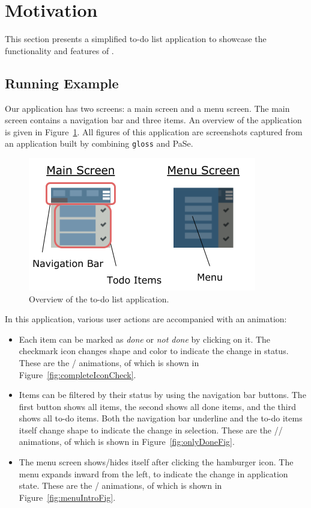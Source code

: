 \section{Motivation}
\label{sec:motivation}

This section presents a simplified to-do list application to showcase the
functionality and features of \dsl{}.

\subsection{Running Example}

Our application has two screens: a main screen and a menu screen. The main screen contains a navigation bar and three items. An overview of the application is given in Figure~\ref{fig:appOverview}. All figures of this application are screenshots captured from an application built by combining \texttt{gloss} and PaSe.

\begin{figure}[!htbp]
\centering
\includegraphics[width=\figscale\textwidth]{pictures/app_overview}
\caption{Overview of the to-do list application.}
\label{fig:appOverview}
\end{figure}

In this application, various user actions are accompanied with an animation:
\begin{itemize}
\item Each item can be marked as \emph{done} or \emph{not done} by clicking on it. The
checkmark icon changes shape and color to indicate the change in status. These
are the / animations, of which  is
shown in Figure~\ref{fig:completeIconCheck}.
\item Items can be filtered by their status by using the navigation bar
buttons. The first button shows all items, the second shows all done items, and
the third shows all to-do items. Both the navigation bar underline and the
to-do items itself change shape to indicate the change in selection. These are
the // animations, of which
 is shown in Figure~\ref{fig:onlyDoneFig}.
\item The menu screen shows/hides itself after clicking the hamburger icon. The
menu expands inward from the left, to indicate the change in application state.
These are the / animations, of which 
is shown in Figure~\ref{fig:menuIntroFig}.
\end{itemize}

